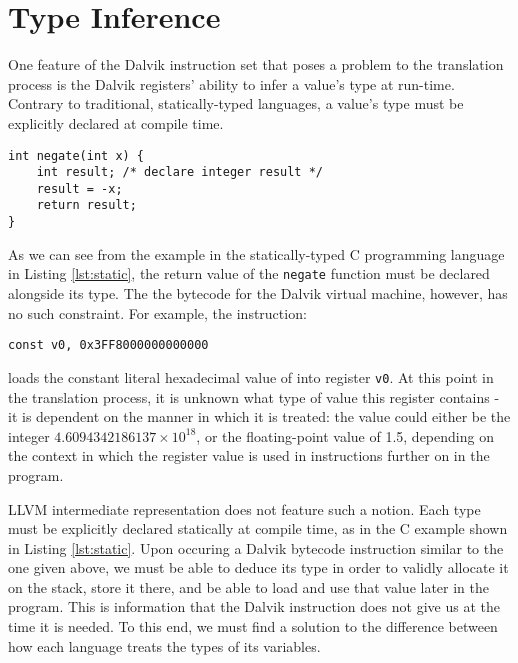 \section{Type Inference}
\label{sec:typeinf}

One feature of the Dalvik instruction set that poses a problem to the translation process is the Dalvik registers' ability to infer a value's type at run-time. Contrary to traditional, statically-typed languages, a value's type must be explicitly declared at compile time.

\lstset{
	language=C,
	basicstyle=\small,
	stringstyle=\ttfamily
}

\begin{lstlisting}[frame=single, caption={C example}, label=lst:static]
int negate(int x) {
    int result; /* declare integer result */
    result = -x;
    return result;
}
\end{lstlisting}

As we can see from the example in the statically-typed C programming language in Listing \ref{lst:static}, the return value of the \verb|negate| function must be declared alongside its type. The the bytecode for the Dalvik virtual machine, however, has no such constraint. For example, the instruction:

\lstset{
	language=Assembly,
	basicstyle=\small,
	stringstyle=\ttfamily
}

\begin{lstlisting}[]
const v0, 0x3FF8000000000000
\end{lstlisting}

loads the constant literal hexadecimal value of  into register \verb|v0|. At this point in the translation process, it is unknown what type of value this register contains - it is dependent on the manner in which it is treated: the value could either be the integer $4.6094342186137 \times 10^{18}$, or the floating-point value of 1.5, depending on the context in which the register value is used in instructions further on in the program.

LLVM intermediate representation does not feature such a notion. Each type must be explicitly declared statically at compile time, as in the C example shown in Listing \ref{lst:static}. Upon occuring a Dalvik bytecode instruction similar to the one given above, we must be able to deduce its type in order to validly allocate it on the stack, store it there, and be able to load and use that value later in the program. This is information that the Dalvik instruction does not give us at the time it is needed. To this end, we must find a solution to the difference between how each language treats the types of its variables.

